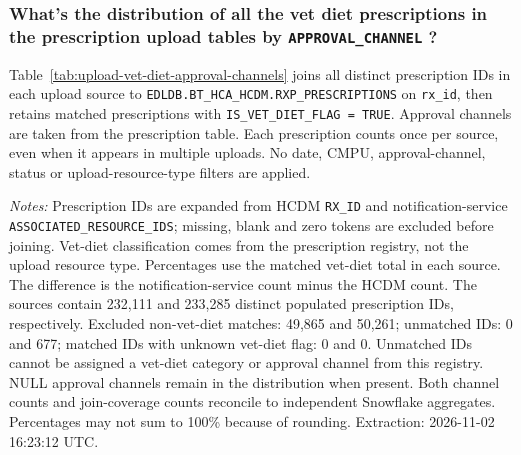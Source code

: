 \subsubsection{What's the distribution of all the vet diet prescriptions in the prescription upload tables by \texttt{APPROVAL\_CHANNEL} ?}
\label{subsec:upload-vet-diet-approval-channels}
Table~\ref{tab:upload-vet-diet-approval-channels} joins all distinct prescription IDs in each upload source to \texttt{EDLDB.BT\_HCA\_HCDM.RXP\_PRESCRIPTIONS} on \texttt{rx\_id}, then retains matched prescriptions with \texttt{IS\_VET\_DIET\_FLAG = TRUE}. Approval channels are taken from the prescription table. Each prescription counts once per source, even when it appears in multiple uploads. No date, CMPU, approval-channel, status or upload-resource-type filters are applied.


\noindent\textit{Notes:} Prescription IDs are expanded from HCDM \texttt{RX\_ID} and notification-service \texttt{ASSOCIATED\_RESOURCE\_IDS}; missing, blank and zero tokens are excluded before joining. Vet-diet classification comes from the prescription registry, not the upload resource type. Percentages use the matched vet-diet total in each source. The difference is the notification-service count minus the HCDM count. The sources contain 232,111 and 233,285 distinct populated prescription IDs, respectively. Excluded non-vet-diet matches: 49,865 and 50,261; unmatched IDs: 0 and 677; matched IDs with unknown vet-diet flag: 0 and 0. Unmatched IDs cannot be assigned a vet-diet category or approval channel from this registry. NULL approval channels remain in the distribution when present. Both channel counts and join-coverage counts reconcile to independent Snowflake aggregates. Percentages may not sum to 100\% because of rounding. Extraction: 2026-11-02 16:23:12 UTC.



\clearpage

